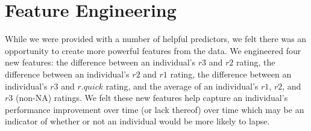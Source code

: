 \documentclass[11pt, oneside]{article}   	%
\begin{document}
\section {Feature Engineering}
While we were provided with a number of helpful predictors, we felt there was an opportunity to create more powerful features from the data. We engineered four new features: the difference between an individual's $r3$ and $r2$ rating, the difference between an individual's $r2$ and $r1$ rating, the difference between an individual's $r3$ and $r.quick$ rating, and the average of an individual's $r1$, $r2$, and $r3$ (non-NA) ratings. We felt these new features help capture an individual's performance improvement over time (or lack thereof) over time which may be an indicator of whether or not an individual would be more likely to lapse.
\end{document}
